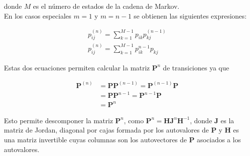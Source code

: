 donde $M$ es el número de estados de la cadena de Markov. \\

En los casos especiales $m=1$ y $m = n-1$ se obtienen las siguientes expresiones:

\begin{eqnarray}
p_{ij}^{(n)} = \sum\limits_{k=1}^{M-1} p_{ik}p_{kj}^{(n-1)}\\
p_{ij}^{(n)} = \sum\limits_{k=1}^{M-1} p_{ik}^{n-1}p_{kj}
\end{eqnarray}

Estas dos ecuaciones permiten calcular la matriz $\mathbf{P}^n$ de transiciones ya que 

\begin{align*}
\mathbf{P}^{(n)} & = \mathbf{P} \mathbf{P}^{(n-1)} = \mathbf{P}^{(n-1)} \mathbf{P}\\
				 & = \mathbf{P} \mathbf{P}^{n-1} = \mathbf{P}^{n-1} \mathbf{P} \\
				 & = \mathbf{P}^n 
\end{align*} 

Esto permite descomponer la matriz $\mathbf{P}^n$, como $\mathbf{P}^n = \mathbf{H} \mathbf{J}^n \mathbf{H}^{-1}$, donde $\mathbf{J}$ es la matriz de Jordan, diagonal por cajas formada por los autovalores de $\mathbf{P}$ y $\mathbf{H}$ es una matriz invertible cuyas columnas son los autovectores de $\mathbf{P}$ asociados a los autovalores.

